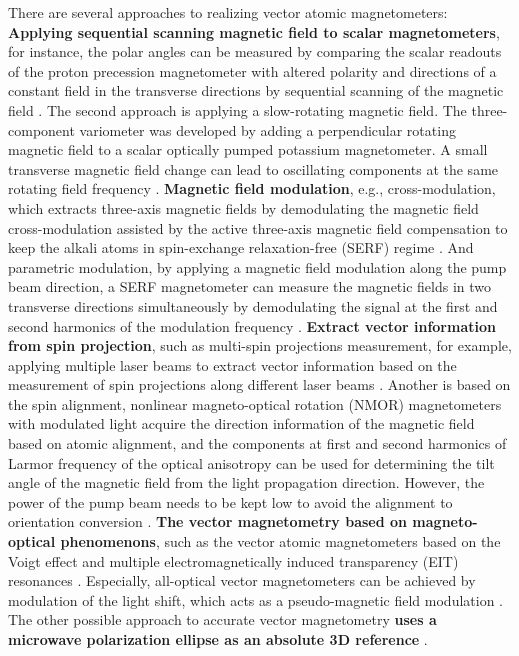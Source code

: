 \documentclass[prx,twocolumn,10pt,nofootinbib]{revtex4-1}
\begin{document}
There are several approaches to realizing vector atomic magnetometers: \textbf{Applying sequential scanning magnetic field to scalar magnetometers}, for instance, the polar angles can be measured by comparing the scalar readouts of the proton precession magnetometer with altered polarity and directions of a constant field in the transverse directions by sequential scanning of the magnetic field \cite{alldredge1960proposed}. The second approach is applying a slow-rotating magnetic field. The three-component variometer was developed by adding a perpendicular rotating magnetic field to a scalar optically pumped potassium magnetometer. A small transverse magnetic field change can lead to oscillating components at the same rotating field frequency \cite{alexandrov2004three, vershovskii2006fast}. \textbf{Magnetic field modulation}, e.g., cross-modulation, which extracts three-axis magnetic fields by demodulating the magnetic field cross-modulation assisted by the active three-axis magnetic field compensation to keep the alkali atoms in spin-exchange relaxation-free (SERF) regime \cite{seltzer2004unshielded}. And parametric modulation, by applying a magnetic field modulation along the pump beam direction, a SERF magnetometer can measure the magnetic fields in two transverse directions simultaneously by demodulating the signal at the first and second harmonics of the modulation frequency \cite{li2006parametric}. \textbf{Extract vector information from spin projection}, such as multi-spin projections measurement, for example, applying multiple laser beams to extract vector information based on the measurement of spin projections along different laser beams \cite{fairweather1972vector, afach2015highly, bison2018sensitive, huang2015three}. Another is based on the spin alignment, nonlinear magneto-optical rotation (NMOR) magnetometers with modulated light acquire the direction information of the magnetic field based on atomic alignment, and the components at first and second harmonics of Larmor frequency of the optical anisotropy can be used for determining the tilt angle of the magnetic field from the light propagation direction. However, the power of the pump beam needs to be kept low to avoid the alignment to orientation conversion  \cite{pustelny2006nonlinear, auzinsh2009light}. \textbf{The vector magnetometry based on magneto-optical phenomenons}, such as the vector atomic magnetometers based on the Voigt effect \cite{pyragius2019voigt} and multiple electromagnetically induced transparency (EIT) resonances \cite{cox2011measurements}. Especially, all-optical vector magnetometers can be achieved by modulation of the light shift, which acts as a pseudo-magnetic field modulation \cite{patton2014all}. The other possible approach to accurate vector magnetometry \textbf{uses a microwave polarization ellipse as an absolute 3D reference} \cite{kiehl2021accurate}.
\end{document}
